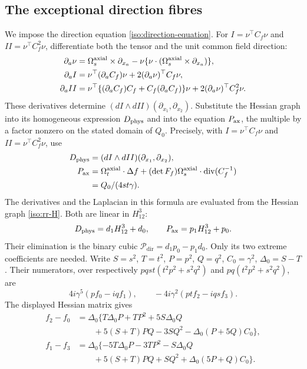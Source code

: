 \documentclass[11pt,a4paper]{article}
\numberwithin{equation}{section}
\theoremstyle{plain}
\theoremstyle{definition}
\theoremstyle{remark}
\begin{document}
\subsection{The exceptional direction fibres}\label{appiso-pencil}
We impose the direction equation \eqref{iso:direction-equation}.
For $I=\nu^{\top} C_f \nu$ and $II=\nu^{\top} C_f^2\nu$, differentiate both the tensor and
the unit common field direction:
\begin{align*}
 \partial_a\nu&=\Omega_s^{\rm axial}\times \partial_{x_a}-\nu\{\nu\cdot(\Omega_s^{\rm axial}\times \partial_{x_a})\},\\
 \partial_aI&=\nu^{\top}(\partial_aC_f)\nu+2(\partial_a\nu)^{\top} C_f\nu,\\
 \partial_aII&=\nu^{\top}\{(\partial_aC_f)C_f+C_f(\partial_aC_f)\}\nu+2(\partial_a\nu)^{\top} C_f^2\nu.
\end{align*}
These derivatives determine $(dI\wedge dII)(\partial_{x_1},\partial_{x_2})$.
Substitute the Hessian graph into its homogeneous expression $D_{\rm phys}$
and into the equation $P_{\rm ax}$, the multiple by a factor nonzero on the stated domain
of $Q_0$.  Precisely, with $I=\nu^{\top} C_f \nu$ and $II=\nu^{\top} C_f^2\nu$, use
\[
 \begin{aligned}
 D_{\rm phys}&=(dI\wedge dII)(\partial_{x_1},\partial_{x_2}),\\
 P_{\rm ax}&=\Omega_t^{\rm axial}\cdot\Delta f+(\det F_f)\Omega_s^{\rm axial}\cdot\operatorname{div}(C_f^{-1})\\
           &=Q_0/(4st\gamma).
 \end{aligned}
\]
The derivatives and the Laplacian in this formula are evaluated from the
Hessian graph \eqref{iso:rr-H}.  Both are linear in $H_{12}^3$:
\[
 D_{\rm phys}=d_1H_{12}^3+d_0,\qquad P_{\rm ax}=p_1H_{12}^3+p_0.
\]
Their elimination is the binary cubic $\mathcal P_{\mathrm{dir}}=d_1p_0-p_1d_0$.
Only its two extreme coefficients are needed.  Write
$S=s^2$, $T=t^2$, $P=p^2$, $Q=q^2$, $C_0=\gamma^2$, $\Delta_0=S-T$.
Their numerators, over respectively
$pqst(t^2p^2+s^2q^2)$ and $pq(t^2p^2+s^2q^2)$, are
\[
 4i\gamma^5(pf_0-iqf_1),\qquad -4i\gamma^2(ptf_2-iqsf_3).
\]
The displayed Hessian matrix gives
\begin{align*}
 f_2-f_0&=\Delta_0\{T\Delta_0P+TP^2+5S\Delta_0Q\\
 &\qquad+5(S+T)PQ-3SQ^2-\Delta_0(P+5Q)C_0\},\\
 f_1-f_3&=\Delta_0\{-5T\Delta_0P-3TP^2-S\Delta_0Q\\
 &\qquad+5(S+T)PQ+SQ^2+\Delta_0(5P+Q)C_0\}.
\end{align*}
\end{document}
